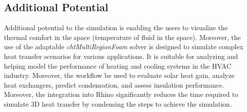 \subsection{Additional Potential}
Additional potential to the simulation is enabling the users to visualize the thermal comfort in the space (temperature of fluid in the space). Moreover, the use of the adaptable \textit{chtMultiRegionFoam} solver is designed to simulate complex heat transfer scenarios for various applications. It is suitable for analyzing and helping model the performance of heating and cooling systems in the HVAC  industry. Moreover, the workflow be used to evaluate solar heat gain, analyze heat exchangers, predict condensation, and assess insulation performance. Moreover, the integration into
Rhino significantly reduces the time required to simulate 3D heat transfer by condensing the steps to achieve the simulation.



